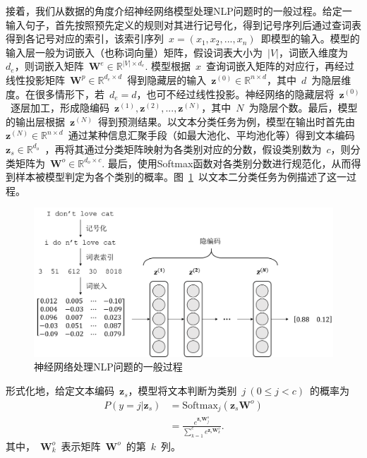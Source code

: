 接着，我们从数据的角度介绍神经网络模型处理NLP问题时的一般过程。给定一输入句子，首先按照预先定义的规则对其进行记号化，得到记号序列后通过查词表得到各记号对应的索引，该索引序列~$x = (x_1, x_2, ..., x_n)$~即模型的输入。模型的输入层一般为词嵌入（也称词向量）矩阵，假设词表大小为~$|V|$，词嵌入维度为~$d_e$，则词嵌入矩阵~$\mathbf{W}^e \in \mathbb{R}^{|V|\times d_e}$. 模型根据~$x$~查询词嵌入矩阵的对应行，再经过线性投影矩阵~$\mathbf{W}^p\in \mathbb{R}^{d_e \times d}$~得到隐藏层的输入~$\mathbf{z}^{(0)}\in \mathbb{R}^{n\times d}$，其中~$d$~为隐层维度。在很多情形下，若~$d_e = d$，也可不经过线性投影。神经网络的隐藏层将~$\mathbf{z}^{(0)}$~逐层加工，形成隐编码~$\mathbf{z}^{(1)}, \mathbf{z}^{(2)}, ..., \mathbf{z}^{(N)}$，其中~$N$~为隐层个数。最后，模型的输出层根据~$\mathbf{z}^{(N)}$~得到预测结果。以文本分类任务为例，模型在输出时首先由~$\mathbf{z}^{(N)}\in \mathbb{R}^{n\times d}$~通过某种信息汇聚手段（如最大池化、平均池化等）得到文本编码~$\mathbf{z}_s\in \mathbb{R}^{d_o}$~，再将其通过分类矩阵映射为各类别对应的分数，假设类别数为~$c$，则分类矩阵为~$\mathbf{W}^o\in \mathbb{R}^{d_o\times c}$. 最后，使用Softmax函数对各类别分数进行规范化，从而得到样本被模型判定为各个类别的概率。图~\ref{fig:nlp_ppl}~以文本二分类任务为例描述了这一过程。

\begin{figure}[htb]
	\centering
	\includegraphics[scale=0.55]{nlp_pipline.png}
	\caption{神经网络处理NLP问题的一般过程}
	\label{fig:nlp_ppl}
\end{figure}

形式化地，给定文本编码~$\mathbf{z}_s$，模型将文本判断为类别~$j~(0\le j < c)$~的概率为
\begin{equation}
	\begin{aligned}
		P(y = j | \mathbf{z}_s) &= \mathrm{Softmax}_j(\mathbf{z}_s\mathbf{W}^o)\\
		&= \frac{e^{\mathbf{z}_s\mathbf{W}^o_j}}{\sum_{k=1}^{c}e^{\mathbf{z}_s\mathbf{W}^o_k}}.
	\end{aligned}
	\label{eq:softmax}
\end{equation}
其中，~$\mathbf{W}^o_k$~表示矩阵~$\mathbf{W}^o$~的第~$k$~列。

